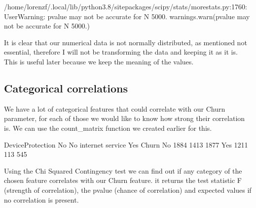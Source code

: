 \documentclass[letterpaper,10pt,english]{jupyterBook}
\begin{document}
\begin{sphinxVerbatim}[commandchars=\\\{\}]
/home/lorenzf/.local/lib/python3.8/site\PYGZhy{}packages/scipy/stats/morestats.py:1760: UserWarning: p\PYGZhy{}value may not be accurate for N \PYGZgt{} 5000.
  warnings.warn(\PYGZdq{}p\PYGZhy{}value may not be accurate for N \PYGZgt{} 5000.\PYGZdq{})
\end{sphinxVerbatim}

\sphinxAtStartPar
It is clear that our numerical data is not normally distributed, as mentioned not essential, therefore I will not be transforming the data and keeping it as it is. This is useful later because we keep the meaning of the values.


\subsection{Categorical correlations}
\label{\detokenize{c7_case_studies/Churn:categorical-correlations}}
\sphinxAtStartPar
We have a lot of categorical features that could correlate with our Churn parameter, for each of those we would like to know how strong their correlation is. We can use the count\_matrix function we created earlier for this.

\begin{sphinxVerbatim}[commandchars=\\\{\}]
\end{sphinxVerbatim}

\begin{sphinxVerbatim}[commandchars=\\\{\}]
DeviceProtection    No  No internet service   Yes
Churn                                            
No                1884                 1413  1877
Yes               1211                  113   545
\end{sphinxVerbatim}

\sphinxAtStartPar
Using the Chi Squared Contingency test we can find out if any category of the chosen feature correlates with our Churn feature. it returns the test statistic F (strength of correlation), the p\sphinxhyphen{}value (chance of correlation) and expected values if no correlation is present.

\begin{sphinxVerbatim}[commandchars=\\\{\}]
     
\end{sphinxVerbatim}
\end{document}
